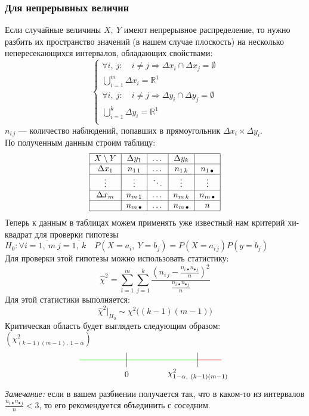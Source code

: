 \documentclass[12pt, a4paper]{article}
\newcommand{\real}{\mathbb{R}}
\begin{document}
\subsubsection*{Для непрерывных величин}
Если случайные величины $X,\ Y$ имеют непрерывное распределение, то нужно разбить их пространство значений (в нашем случае плоскость) на несколько непересекающихся интервалов, обладающих свойствами:
\[
\begin{cases}
    \forall i,\ j:\quad i \neq j \Rightarrow \Delta x_i \cap \Delta x_j = \emptyset\\
    \bigcup\limits_{i = 1}^{m} \Delta x_i = \real^1\\
    \forall i,\ j:\quad i \neq j \Rightarrow \Delta y_i \cap \Delta y_j = \emptyset\\
    \bigcup\limits_{i = 1}^{k} \Delta y_i = \real^1\\
\end{cases}
\]
$n_{i\, j}$ --- количество наблюдений, попавших в прямоугольник $\Delta x_i \times \Delta y_i$.\\
По полученным данным строим таблицу:
\[
    \begin{tabular}{|c|c|c|c|c|}
        \hline
        $X\setminus Y$ & $\Delta y_1$ & $\dots$ & $\Delta y_k$ & \\
        \hline
        $\Delta x_1$          & $n_{1\, 1}$ & $\dots$ & $n_{1\, k}$ & $n_{1\, \bullet}$\\
        \hline
        $\vdots$       & $\vdots$ & $\ddots$ & $\vdots$ & $\vdots$\\
        \hline
        $\Delta x_m$          & $n_{m\, 1}$ & $\dots$ & $n_{m\, k}$ & $n_{m\, \bullet}$\\
        \hline
                     & $n_{m\, \bullet}$ & $\dots$ & $n_{m\, \bullet}$ & $n$\\
        \hline
    \end{tabular}
\]
Теперь к данным в таблицах можем применять уже известный нам критерий хи-квадрат для проверки гипотезы $H_0: \forall i = \overline{1,\ m}\ j = \overline{1,\ k}\quad P(X = a_{i},\ Y = b_{j}) = P(X = a_{i\, j}) P(y = b_j)$\\
Для проверки этой гипотезы можно использовать статистику:
\[
\hat \chi^2 = \sum_{i = 1}^{m} \sum_{j = 1}^{k} \frac{ { \left( n_{i\, j} - \frac{n_{i\, \bullet} n_{\bullet\, j}}{n} \right) }^2 }{\frac{n_{i\, \bullet} n_{\bullet\, j}}{n}}
\]
Для этой статистики выполняется:
\[
\hat \chi^2 \Big|_{H_0} \sim \chi^2\big( (k - 1)(m - 1) \big)
\]
Критическая область будет выглядеть следующим образом: $(\chi^2_{(k - 1)(m - 1),\ 1 - \alpha})$
\[
\begin{tikzpicture}[scale=2]
    \draw[green] (-1, 0) -- (0, 0);
    \draw[green] (0, 0) -- (1.5, 0);
    \draw[red] (1.5, 0) -- (2, 0);
    \draw (0, -0.15) -- ++(0, 0.3);
    \node at (0, -0.3) (a) {$0$};
    \draw (1.5, -0.15) -- ++(0, 0.3);
    \node at (1.5, -0.3) (a) {$\chi^2_{1 - \alpha,\ (k - 1)(m - 1)}$};
\end{tikzpicture}
\]
\textit{Замечание:} если в вашем разбиении получается так, что в каком-то из интервалов $\frac{n_{i\, \bullet} n_{\bullet\, j}}{n} < 3$, то его рекомендуется объединить с соседним.
\end{document}
